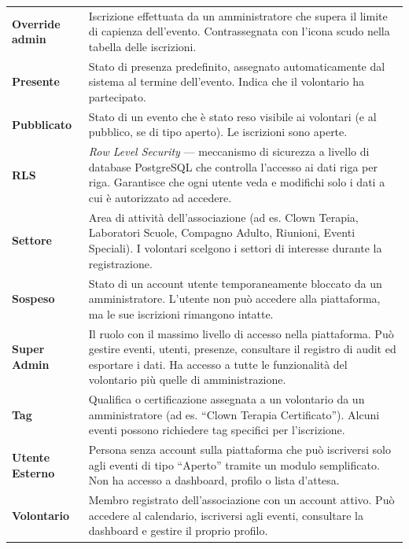 \documentclass[a4paper,11pt,oneside]{book}
\begin{document}
\begin{longtable}{l p{10cm}}
\textbf{Override admin} & Iscrizione effettuata da un amministratore che supera il limite di capienza dell'evento. Contrassegnata con l'icona scudo nella tabella delle iscrizioni. \\[4pt]
\textbf{Presente} & Stato di presenza predefinito, assegnato automaticamente dal sistema al termine dell'evento. Indica che il volontario ha partecipato. \\[4pt]
\textbf{Pubblicato} & Stato di un evento che \`e stato reso visibile ai volontari (e al pubblico, se di tipo aperto). Le iscrizioni sono aperte. \\[4pt]
\textbf{RLS} & \textit{Row Level Security} --- meccanismo di sicurezza a livello di database PostgreSQL che controlla l'accesso ai dati riga per riga. Garantisce che ogni utente veda e modifichi solo i dati a cui \`e autorizzato ad accedere. \\[4pt]
\textbf{Settore} & Area di attivit\`a dell'associazione (ad es. Clown Terapia, Laboratori Scuole, Compagno Adulto, Riunioni, Eventi Speciali). I volontari scelgono i settori di interesse durante la registrazione. \\[4pt]
\textbf{Sospeso} & Stato di un account utente temporaneamente bloccato da un amministratore. L'utente non pu\`o accedere alla piattaforma, ma le sue iscrizioni rimangono intatte. \\[4pt]
\textbf{Super Admin} & Il ruolo con il massimo livello di accesso nella piattaforma. Pu\`o gestire eventi, utenti, presenze, consultare il registro di audit ed esportare i dati. Ha accesso a tutte le funzionalit\`a del volontario pi\`u quelle di amministrazione. \\[4pt]
\textbf{Tag} & Qualifica o certificazione assegnata a un volontario da un amministratore (ad es. ``Clown Terapia Certificato''). Alcuni eventi possono richiedere tag specifici per l'iscrizione. \\[4pt]
\textbf{Utente Esterno} & Persona senza account sulla piattaforma che pu\`o iscriversi solo agli eventi di tipo ``Aperto'' tramite un modulo semplificato. Non ha accesso a dashboard, profilo o lista d'attesa. \\[4pt]
\textbf{Volontario} & Membro registrato dell'associazione con un account attivo. Pu\`o accedere al calendario, iscriversi agli eventi, consultare la dashboard e gestire il proprio profilo. \\
\bottomrule
\end{longtable}


\end{document}
